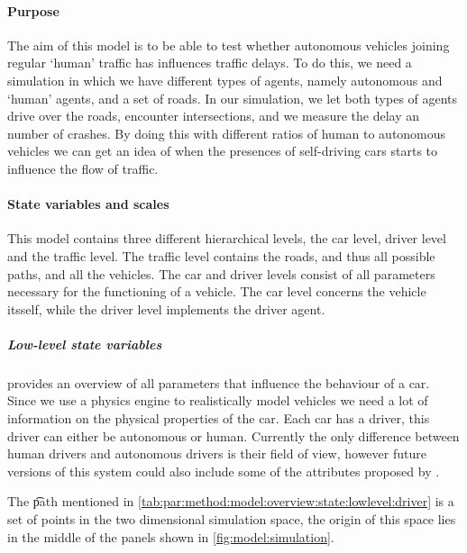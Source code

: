 \paragraph{Purpose}
\label{par:method:model:overview:purpose}
The aim of this model is to be able to test whether autonomous vehicles joining regular `human' traffic has influences traffic delays. To do this, we need a simulation in which we have different types of agents, namely autonomous and `human' agents, and a set of roads. In our simulation, we let both types of agents drive over the roads, encounter intersections, and we  measure the delay an number of crashes. By doing this with different ratios of human to autonomous vehicles we can get an idea of when the presences of self-driving cars starts to influence the flow of traffic.

\paragraph{State variables and scales}
\label{par:method:model:overview:state}
This model contains three different hierarchical levels, the car level, driver level and the traffic level. The traffic level contains the roads, and thus all possible paths, and all the vehicles. The car and driver levels consist of all parameters necessary for the functioning of a vehicle. The car level concerns the vehicle itsself, while the driver level implements the driver agent.

\subparagraph{Low-level state variables}
 provides an overview of all parameters that influence the behaviour of a car. Since we use a physics engine to realistically model vehicles we need a lot of information on the physical properties of the car. Each car has a driver, this driver can either be autonomous or human. Currently the only difference between human drivers and autonomous drivers is their field of view, however future versions of this system could also include some of the attributes proposed by \citeauthor{paruchuri2002multi}. 

The \t{path} mentioned in \cref{tab:par:method:model:overview:state:lowlevel:driver} is a set of points in the two dimensional simulation space, the origin of this space lies in the middle of the panels shown in \cref{fig:model:simulation}. 

